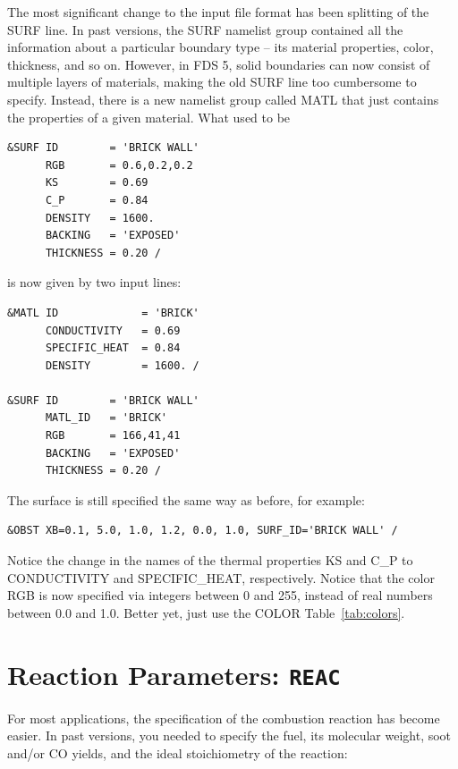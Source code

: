\documentclass[11pt]{book}
\begin{document}
The most significant change to the input file format has been splitting of the {\ct SURF} line. In past versions, the {\ct SURF}
namelist group contained all the information about a particular boundary type -- its material properties, color, thickness, and so on.
However, in FDS 5, solid boundaries can now consist of multiple layers of materials, making the old {\ct SURF} line too cumbersome to
specify. Instead, there is a new namelist group called {\ct MATL} that just contains the properties of a given material. What used to
be

\footnotesize
\begin{verbatim}
&SURF ID        = 'BRICK WALL'
      RGB       = 0.6,0.2,0.2
      KS        = 0.69
      C_P       = 0.84
      DENSITY   = 1600.
      BACKING   = 'EXPOSED'
      THICKNESS = 0.20 /
\end{verbatim}
\normalsize

\noindent
is now given by two input lines:

\footnotesize
\begin{verbatim}
&MATL ID             = 'BRICK'
      CONDUCTIVITY   = 0.69
      SPECIFIC_HEAT  = 0.84
      DENSITY        = 1600. /

&SURF ID        = 'BRICK WALL'
      MATL_ID   = 'BRICK'
      RGB       = 166,41,41
      BACKING   = 'EXPOSED'
      THICKNESS = 0.20 /
\end{verbatim}
\normalsize

\noindent
The surface is still specified the same way as before, for example:

\footnotesize
\begin{verbatim}
&OBST XB=0.1, 5.0, 1.0, 1.2, 0.0, 1.0, SURF_ID='BRICK WALL' /
\end{verbatim}
\normalsize

\noindent
Notice the change in the names of the thermal properties {\ct KS} and {\ct C\_P} to {\ct CONDUCTIVITY} and
{\ct SPECIFIC\_HEAT}, respectively. Notice that the color {\ct RGB} is now specified via integers between 0 and 255, instead of
real numbers between 0.0 and 1.0. Better yet, just use the {\ct COLOR} Table~\ref{tab:colors}.



\section{Reaction Parameters: \texorpdfstring{{\tt REAC}}{REAC}}

For most applications, the specification of the combustion reaction has become easier. In past versions, you needed to specify the fuel, its molecular weight, soot and/or CO yields, and the ideal stoichiometry of the reaction:
\end{document}
